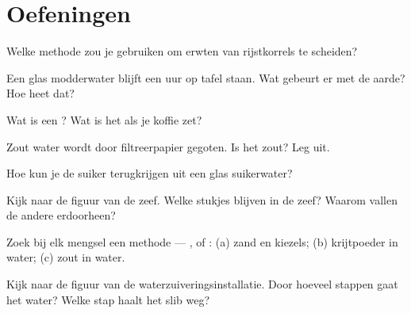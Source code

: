 \section{Oefeningen}

\begin{exercise}[$\star$]\label{exo:g3:separating-mixtures:1}
Welke methode zou je gebruiken om erwten van rijstkorrels te scheiden?
\end{exercise}

\begin{exercise}[$\star$]\label{exo:g3:separating-mixtures:2}
Een glas modderwater blijft een uur op tafel staan. Wat gebeurt er met
de aarde? Hoe heet dat?
\end{exercise}

\begin{exercise}[$\star$]\label{exo:g3:separating-mixtures:3}
Wat is een ? Wat is het  als je koffie zet?
\end{exercise}

\begin{exercise}[$\star$]\label{exo:g3:separating-mixtures:4}
Zout water wordt door filtreerpapier gegoten. Is het  zout?
Leg uit.
\end{exercise}

\begin{exercise}[$\star$]\label{exo:g3:separating-mixtures:5}
Hoe kun je de suiker terugkrijgen uit een glas suikerwater?
\end{exercise}

\begin{exercise}[$\star$]\label{exo:g3:separating-mixtures:6}
Kijk naar de figuur van de zeef. Welke stukjes blijven in de zeef? Waarom
vallen de andere erdoorheen?
\end{exercise}

\begin{exercise}[$\star$]\label{exo:g3:separating-mixtures:7}
Zoek bij elk mengsel een methode --- ,  of :
(a) zand en kiezels; (b) krijtpoeder in water; (c) zout in water.
\end{exercise}

\begin{exercise}[$\star$]\label{exo:g3:separating-mixtures:8}
Kijk naar de figuur van de waterzuiveringsinstallatie. Door hoeveel
stappen gaat het water? Welke stap haalt het slib weg?
\end{exercise}

